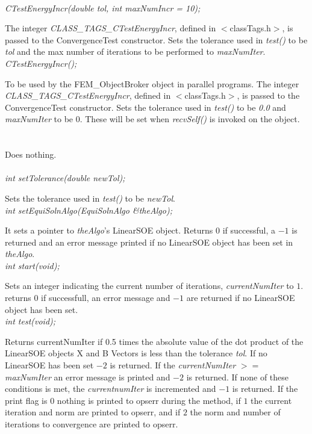   \\
{\em CTestEnergyIncr(double tol, int maxNumIncr = 10);}  

The integer {\em CLASS\_TAGS\_CTestEnergyIncr}, defined in
$<$classTags.h$>$, is passed to the ConvergenceTest constructor. Sets
the tolerance used in {\em test()} to be {\em tol} and the max number
of iterations to be performed to {\em maxNumIter}. \\

{\em CTestEnergyIncr();}  

To be used by the FEM\_ObjectBroker object in parallel programs. The
integer {\em CLASS\_TAGS\_CTestEnergyIncr}, defined in
$<$classTags.h$>$, is passed to the ConvergenceTest constructor. Sets
the tolerance used in {\em test()} to be {\em 0.0} and {\em maxNumIter} 
to be $0$. These will be set when {\em recvSelf()} is invoked on the object. \\


 \\
 \\ 
Does nothing. \\

  \\
{\em int setTolerance(double newTol);} 

Sets the tolerance used in {\em test()} to be {\em newTol}. \\

{\em int setEquiSolnAlgo(EquiSolnAlgo \&theAlgo);} 

It sets a pointer to {\em theAlgo}'s LinearSOE object. Returns $0$ if
successful, a $-1$ is returned and an error message printed if no
LinearSOE object has been set in {\em theAlgo}. \\


{\em int start(void);} 

Sets an integer indicating the current number of iterations, {\em
currentNumIter} to $1$. returns $0$ if successfull, an error message
and $-1$ are returned if no LinearSOE object has been set. \\

{\em int test(void);} 

Returns {currentNumIter} if 0.5 times the absolute value of the dot product of
the LinearSOE objects X and B Vectors is less than the tolerance {\em
tol}. If no LinearSOE has been set $-2$ is returned. If the {\em
currentNumIter} $>=$ {\em maxNumIter} an error message is printed and
$-2$ is returned. If none of these conditions is met, the {\em
currentnumIter} is incremented and $-1$ is returned. If the print flag
is $0$ nothing is printed to 
opserr during the method, if $1$ the current iteration and norm are
printed to opserr, and if $2$ the norm and number of iterations to convergence
are printed to opserr. \\ 


